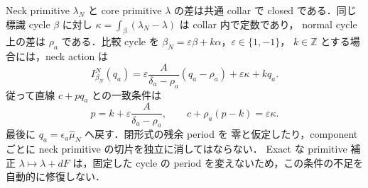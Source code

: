 \begin{remark}
Neck primitive $\lambda_N$ と core primitive $\lambda$ の差は共通 collar で
closed である．同じ標識 cycle $\beta$ に対し
$\kappa=\int_\beta(\lambda_N-\lambda)$ は collar 内で定数であり，
normal cycle 上の差は $\rho_a$ である．比較 cycle を
$\beta_N=\varepsilon\beta+k\alpha$，$\varepsilon\in\{1,-1\}$，
$k\in\mathbb Z$ とする場合には，neck action は
\[
 I^N_{\beta_N}(q_a)
 =\varepsilon\frac{A}{\delta_a-\rho_a}(q_a-\rho_a)
   +\varepsilon\kappa+kq_a.
\]
従って直線 $c+pq_a$ との一致条件は
\[
 p=k+\varepsilon\frac{A}{\delta_a-\rho_a},\qquad
 c+\rho_a(p-k)=\varepsilon\kappa.
\]
最後に $q_a=\epsilon_a\widehat\mu_N$ へ戻す．閉形式の残余 period を
零と仮定したり，component ごとに neck primitive の切片を独立に消してはならない．
Exact な primitive 補正 $\lambda\mapsto\lambda+dF$ は，固定した cycle の
period を変えないため，この条件の不足を自動的に修復しない．
\end{remark}

